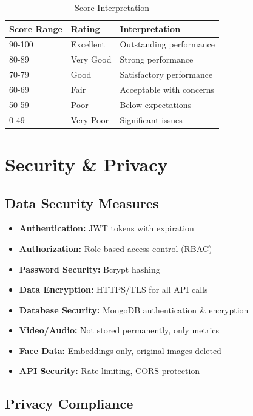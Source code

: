 \documentclass[12pt,a4paper]{article}
\begin{document}
\begin{table}[h!]
\centering
\begin{tabular}{|l|l|l|}
\hline
\textbf{Score Range} & \textbf{Rating} & \textbf{Interpretation} \\
\hline
90-100 & Excellent & Outstanding performance \\
80-89 & Very Good & Strong performance \\
70-79 & Good & Satisfactory performance \\
60-69 & Fair & Acceptable with concerns \\
50-59 & Poor & Below expectations \\
0-49 & Very Poor & Significant issues \\
\hline
\end{tabular}
\caption{Score Interpretation}
\end{table}

\newpage

\section{Security \& Privacy}

\subsection{Data Security Measures}

\begin{itemize}
    \item \textbf{Authentication:} JWT tokens with expiration
    \item \textbf{Authorization:} Role-based access control (RBAC)
    \item \textbf{Password Security:} Bcrypt hashing
    \item \textbf{Data Encryption:} HTTPS/TLS for all API calls
    \item \textbf{Database Security:} MongoDB authentication \& encryption
    \item \textbf{Video/Audio:} Not stored permanently, only metrics
    \item \textbf{Face Data:} Embeddings only, original images deleted
    \item \textbf{API Security:} Rate limiting, CORS protection
\end{itemize}

\subsection{Privacy Compliance}
\end{document}
